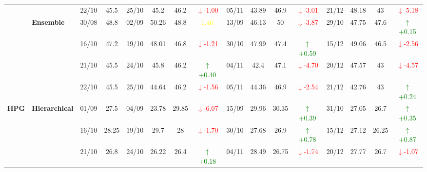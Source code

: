 \documentclass{ieeeaccess}
\begin{document}
{\begin{longtable}{llcc|cccc|cccc|cccc}
&
& 22/10 & 45.5 & 25/10 & 45.2 & 46.2 & \textcolor{red}{\(\downarrow\)-1.00} & 05/11 & 43.89 & 46.9 & \textcolor{red}{\(\downarrow\)-3.01} & 21/12 & 48.18 & 43 & \textcolor{red}{\(\downarrow\)-5.18} \\
\cmidrule(lr){2-16}



& \textbf{Ensemble}
& 30/08 & 48.8 & 02/09 & 50.26 & 48.8 & \textcolor{yellow}{1.46} & 13/09 & 46.13 & 50 & \textcolor{red}{\(\downarrow\)-3.87} & 29/10 & 47.75 & 47.6 & \textcolor{green}{\(\uparrow\)+0.15} \\

&
& 16/10 & 47.2 & 19/10 & 48.01 & 46.8 & \textcolor{red}{\(\downarrow\)-1.21} & 30/10 & 47.99 & 47.4 & \textcolor{green}{\(\uparrow\)+0.59} & 15/12 & 49.06 & 46.5 & \textcolor{red}{\(\downarrow\)-2.56} \\

&
& 21/10 & 45.5 & 24/10 & 45.8 & 46.2 & \textcolor{green}{\(\uparrow\)+0.40} & 04/11 & 42.4 & 47.1 & \textcolor{red}{\(\downarrow\)-4.70} & 20/12 & 47.57 & 43 & \textcolor{red}{\(\downarrow\)-4.57} \\

&
& 22/10 & 45.5 & 25/10 & 44.64 & 46.2 & \textcolor{red}{\(\downarrow\)-1.56} & 05/11 & 44.36 & 46.9 & \textcolor{red}{\(\downarrow\)-2.54} & 21/12 & 42.76 & 43 & \textcolor{green}{\(\uparrow\)+0.24} \\
\midrule


\multirow{12}{*}{\textbf{HPG}} 
& \textbf{Hierarchical}
& 01/09 & 27.5 & 04/09 & 23.78 & 29.85 & \textcolor{red}{\(\downarrow\)-6.07} & 15/09 & 29.96 & 30.35 & \textcolor{green}{\(\uparrow\)+0.39} & 31/10 & 27.05 & 26.7 & \textcolor{green}{\(\uparrow\)+0.35} \\

& 
& 16/10 & 28.25 & 19/10 & 29.7 & 28 & \textcolor{red}{\(\downarrow\)-1.70} & 30/10 & 27.68 & 26.9 & \textcolor{green}{\(\uparrow\)+0.78} & 15/12 & 27.12 & 26.25 & \textcolor{green}{\(\uparrow\)+0.87} \\

& 
& 21/10 & 26.8 & 24/10 & 26.22 & 26.4 & \textcolor{green}{\(\uparrow\)+0.18} & 04/11 & 28.49 & 26.75 & \textcolor{red}{\(\downarrow\)-1.74} & 20/12 & 27.77 & 26.7 & \textcolor{red}{\(\downarrow\)-1.07} \\


\end{longtable}}
\end{document}
